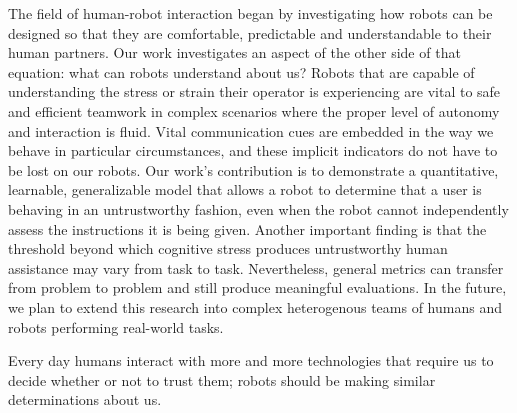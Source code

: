 \documentclass{sig-alternate}
\begin{document}
The field of human-robot interaction began by investigating how robots
can be designed so that they are comfortable, predictable and
understandable to their human partners.  Our work investigates an
aspect of the other side of that equation: what can robots understand
about us?  Robots that are capable of understanding the stress or
strain their operator is experiencing are vital to safe and efficient
teamwork in complex scenarios where the proper level of autonomy and
interaction is fluid.  Vital communication cues are embedded in the
way we behave in particular circumstances, and these implicit
indicators do not have to be lost on our robots.  Our work's
contribution is to demonstrate a quantitative, learnable,
generalizable model that allows a robot to determine that a user is
behaving in an untrustworthy fashion, even when the robot cannot
independently assess the instructions it is being given.  Another
important finding is that the threshold beyond which cognitive stress
produces untrustworthy human assistance may vary from task to task.
Nevertheless, general metrics can transfer from problem to problem and
still produce meaningful evaluations.  In the future, we plan to
extend this research into complex heterogenous teams of humans and
robots performing real-world tasks.

Every day humans interact with more and more technologies that require
us to decide whether or not to trust them; robots should be making
similar determinations about us.

\end{document}
